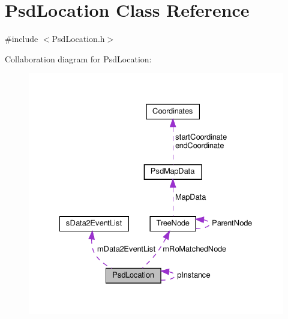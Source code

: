 \hypertarget{class_psd_location}{}\section{Psd\+Location Class Reference}
\label{class_psd_location}


{\ttfamily \#include $<$Psd\+Location.\+h$>$}



Collaboration diagram for Psd\+Location\+:
\nopagebreak
\begin{figure}[H]
\begin{center}
\leavevmode
\includegraphics[width=329pt]{class_psd_location__coll__graph}
\end{center}
\end{figure}
